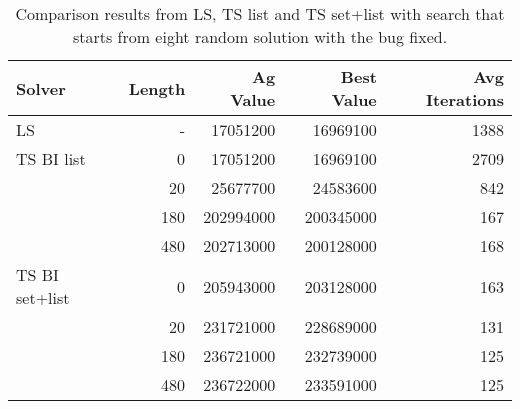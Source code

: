 	\begin{table}[]
		\centering
		\begin{tabular}{lrrrr}
			\toprule
			\textbf{Solver} & \textbf{Length} & \textbf{Ag Value} & \textbf{Best Value} & \textbf{Avg Iterations} \\
			\toprule
			LS              & -                                   & 17051200                              & 16969100                                & 1388                                        \\
			\midrule
			TS BI list      & 0                                   & 17051200                              & 16969100                                & 2709                                        \\
			& 20                                  & 25677700                              & 24583600                                & 842                                         \\
			& 180                                 & 202994000                             & 200345000                               & 167                                         \\
			& 480                                 & 202713000                             & 200128000                               & 168                                         \\
			\midrule
			TS BI set+list  & 0                                   & 205943000                             & 203128000                               & 163 \\
			& 20                                  & 231721000                             & 228689000                               & 131 \\
			& 180                                 & 236721000                             & 232739000                               & 125  \\
			& 480                                 & 236722000                             & 233591000                               & 125  \\
			\bottomrule
		\end{tabular}
		\caption{Comparison results from LS, TS list and TS set+list with search that starts from eight random solution with the bug fixed.}
		\label{tab:8initrnd_2}
	\end{table}
	

\newpage
		
